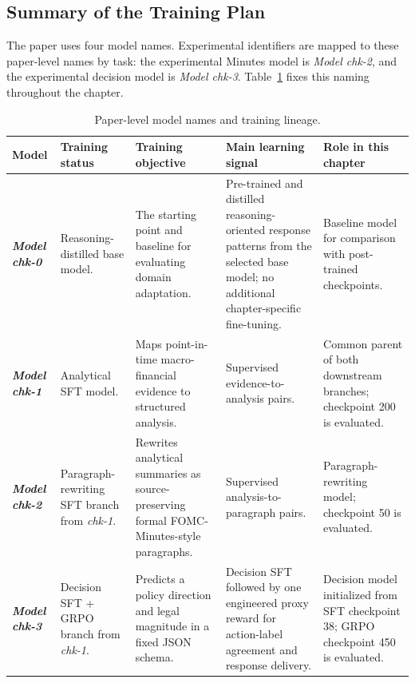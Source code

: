 \subsection*{Summary of the Training Plan}
The paper uses four model names. Experimental identifiers are mapped to these paper-level names by task: the experimental Minutes model is \textit{Model chk-2}, and the experimental decision model is \textit{Model chk-3}. Table~\ref{tab:ch2:model_checkpoints} fixes this naming throughout the chapter.

\begin{table}[htbp]
    \centering
    \footnotesize
    \setlength{\tabcolsep}{4pt}
    \renewcommand{\arraystretch}{1.15}
    \begin{tabularx}{\textwidth}{@{}p{}p{}XXX@{}}
        \toprule
        \textbf{Model} & \textbf{Training status} & \textbf{Training objective} & \textbf{Main learning signal} & \textbf{Role in this chapter} \\
        \midrule
        \textbf{\textit{Model chk-0}} & Reasoning-distilled base model. & The starting point and baseline for evaluating domain adaptation. & Pre-trained and distilled reasoning-oriented response patterns from the selected base model; no additional chapter-specific fine-tuning. & Baseline model for comparison with post-trained checkpoints. \\
        \textbf{\textit{Model chk-1}} & Analytical SFT model. & Maps point-in-time macro-financial evidence to structured analysis. & Supervised evidence-to-analysis pairs. & Common parent of both downstream branches; checkpoint 200 is evaluated. \\
        \hline
        \textbf{\textit{Model chk-2}} & Paragraph-rewriting SFT branch from \textit{chk-1}. & Rewrites analytical summaries as source-preserving formal FOMC-Minutes-style paragraphs. & Supervised analysis-to-paragraph pairs. & Paragraph-rewriting model; checkpoint 50 is evaluated. \\
        \hline
        \textbf{\textit{Model chk-3}} & Decision SFT + GRPO branch from \textit{chk-1}. & Predicts a policy direction and legal magnitude in a fixed JSON schema. & Decision SFT followed by one engineered proxy reward for action-label agreement and response delivery. & Decision model initialized from SFT checkpoint 38; GRPO checkpoint 450 is evaluated. \\
        \bottomrule
    \end{tabularx}
    \caption{Paper-level model names and training lineage.}
    \label{tab:ch2:model_checkpoints}
\end{table}



